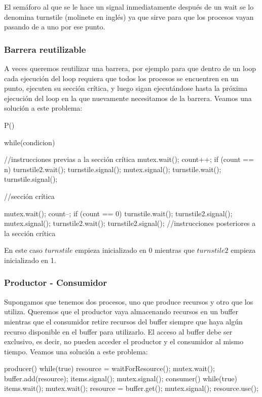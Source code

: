 \documentclass{article}
\begin{document}
El sem\'aforo al que se le hace un signal inmediatamente despu\'es de un wait se lo denomina turnstile (molinete en ingl\'es) ya que sirve para que los procesos vayan pasando de a uno por ese punto.

\subsubsection{Barrera reutilizable}

A veces queremos reutilizar una barrera, por ejemplo para que dentro de un loop cada ejecuci\'on del loop requiera que todos los procesos se encuentren en un punto, ejecuten su secci\'on cr\'itica, y luego sigan ejecut\'andose hasta la pr\'oxima ejecuci\'on del loop en la que nuevamente necesitamos de la barrera. Veamos una soluci\'on a este problema:

\begin{code}
P()
{
    while(condicion)
		{
		    //instrucciones previas a la sección crítica
		    mutex.wait();
				    count++;
						if (count == n)
						{
						    turnstile2.wait();
								turnstile.signal();
						}
				mutex.signal();
				turnstile.wait();
				turnstile.signal();
				
				//sección crítica
				
				mutex.wait();
				    count--;
						if (count == 0)
						{
						    turnstile.wait();
								turnstile2.signal();
						}
				mutex.signal();
				turnstile2.wait();
				turnstile2.signal();
				//instrucciones posteriores a la sección crítica
		}
}
\end{code}

En este caso $turnstile$ empieza inicializado en 0 mientras que $turnstile2$ empieza inicializado en 1.

\subsubsection{Productor - Consumidor}

Supongamos que tenemos dos procesos, uno que produce recursos y otro que los utiliza. Queremos que el productor vaya almacenando recursos en un buffer mientras que el consumidor retire recursos del buffer siempre que haya alg\'un recurso disponible en el buffer para utilizarlo. El acceso al buffer debe ser exclusivo, es decir, no pueden acceder el productor y el consumidor al mismo tiempo. Veamos una soluci\'on a este problema:

\begin{code}
producer()
{
    while(true)
		{
        resource = waitForResource();
    		mutex.wait();
		        buffer.add(resource);
				    items.signal();
	      mutex.signal();
		}
}
consumer()
{
    while(true)
		{
		    items.wait();
				mutex.wait();
				    resource = buffer.get();
			  mutex.signal();
				resource.use();
		}
}
\end{code}
\end{document}
